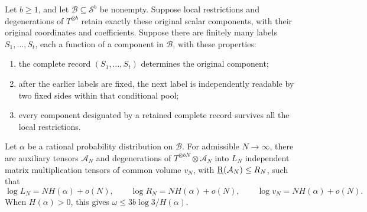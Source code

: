 \begin{lemma}
\label{lem:hierarchy}
Let \(b\geq1\), and let \(\mathcal B\subseteq\mathcal S^b\) be
nonempty.  Suppose local restrictions and degenerations of
\(T^{\otimes b}\) retain exactly these original scalar components, with
their original coordinates and coefficients.  Suppose there are finitely many
labels \(S_1,\ldots,S_t\), each a function of a component in
\(\mathcal B\), with these properties:
\begin{enumerate}[label=\textup{(\roman*)}]
 \item the complete record \((S_1,\ldots,S_t)\) determines the original
       component;
 \item after the earlier labels are fixed, the next label is independently
       readable by two fixed sides within that conditional pool;
 \item every component designated by a retained complete record survives
       all the local restrictions.
\end{enumerate}
Let \(\alpha\) be a rational probability distribution on \(\mathcal B\).
For admissible \(N\to\infty\), there are auxiliary tensors
\(\mathcal A_N\) and degenerations of
\(T^{\otimes bN}\otimes\mathcal A_N\) into \(L_N\) independent matrix
multiplication tensors of common volume \(v_N\), with
\(\operatorname{\underline R}(\mathcal A_N)\leq R_N\), such that
\begin{equation}
 \log L_N=NH(\alpha)+o(N),\qquad
 \log R_N=NH(\alpha)+o(N),\qquad
 \log v_N=NH(\alpha)+o(N).
 \label{alg:hierarchy-rates}
\end{equation}
When \(H(\alpha)>0\), this gives
\(\omega\leq3b\log3/H(\alpha)\).
\end{lemma}
